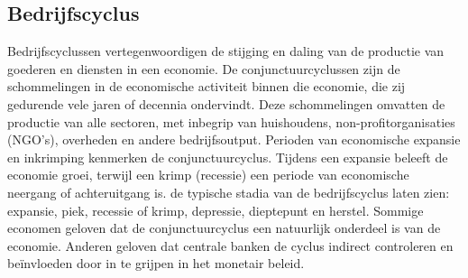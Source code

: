 \subsection{Bedrijfscyclus}
Bedrijfscyclussen vertegenwoordigen de stijging en daling van de productie van goederen en diensten in een economie. De conjunctuurcyclussen zijn de schommelingen in de economische activiteit binnen die economie, die zij gedurende vele jaren of decennia ondervindt. Deze schommelingen omvatten de productie van alle sectoren, met inbegrip van huishoudens, non-profitorganisaties (NGO's), overheden en andere bedrijfsoutput. Perioden van economische expansie en inkrimping kenmerken de conjunctuurcyclus. Tijdens een expansie beleeft de economie groei, terwijl een krimp (recessie) een periode van economische neergang of achteruitgang is.  de typische stadia van de bedrijfscyclus laten zien: expansie, piek, recessie of krimp, depressie, dieptepunt en herstel.
Sommige economen geloven dat de conjunctuurcyclus een natuurlijk onderdeel is van de economie. Anderen geloven dat centrale banken de cyclus indirect controleren en beïnvloeden door in te grijpen in het monetair beleid.



